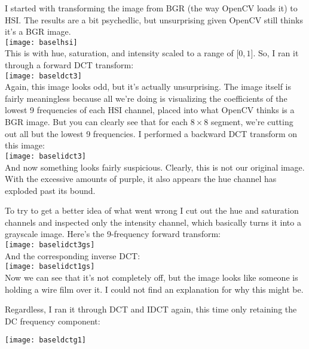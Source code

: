 \documentclass[12pt]{article}
\begin{document}
I started with transforming the image from BGR (the way OpenCV loads it) to HSI.
The results are a bit psychedlic, but unsurprising given OpenCV still thinks
it's a BGR image.\\

\texttt{[image: baselhsi]}\\

This is with hue, saturation, and intensity scaled to a range of $\lbrack0,
1\rbrack$. So, I ran it through a forward DCT transform:\\

\texttt{[image: baseldct3]}\\

Again, this image looks odd, but it's actually unsurprising. The image itself is
fairly meaningless because all we're doing is visualizing the coefficients of
the lowest 9 frequencies of each HSI channel, placed into what OpenCV thinks is
a BGR image. But you can clearly see that for each $8\times8$ segment, we're cutting
out all but the lowest 9 frequencies. I performed a backward DCT
transform on this image:\\

\texttt{[image: baselidct3]}\\

And now something looks fairly suspicious. Clearly, this is not our original
image. With the excessive amounts of purple, it also appears the hue channel has
exploded past its bound.

To try to get a better idea of what went wrong I cut out the hue and saturation channels and
inspected only the intensity channel, which basically turns it into a grayscale
image. Here's the 9-frequency forward transform:\\

\texttt{[image: baselidct3gs]}\\

And the corresponding inverse DCT:\\

\texttt{[image: baselidct1gs]}\\

Now we can see that it's not completely off, but the image looks like someone is
holding a wire film over it. I could not find an explanation for why this might
be.

Regardless, I ran it through DCT and IDCT again, this time only retaining the DC
frequency component:

\texttt{[image: baseldctg1]}\\
\end{document}
